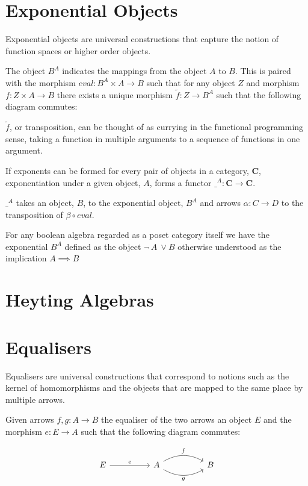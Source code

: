 \documentclass[a4paper,12pt]{article}
\begin{document}
\section{Exponential Objects}
Exponential objects are universal constructions that capture the notion of
function spaces or higher order objects.

The object $B^{A}$ indicates the mappings from the object $A$ to $B$. This is
paired with the morphism $eval: B^{A} \times A \rightarrow B$ such that for any
object $Z$ and morphism $f : Z\times A \rightarrow B$ there exists a unique
morphism $\tilde{f}: Z \rightarrow B^{A}$ such that the following diagram
commutes:


$\tilde{f}$, or transposition, can be thought of as currying in the functional
programming sense, taking a function in multiple arguments to a sequence of
functions in one argument.

If exponents can be formed for every pair of objects in a category, \textbf{C},
exponentiation under a given object, $A$, forms a functor $\_^{A}: \textbf{C}
\rightarrow \textbf{C}$.

$\_^{A}$ takes an object, $B$, to the exponential object, $B^{A}$ and arrows
$\alpha: C \rightarrow D$ to the transposition of $\beta \circ eval$.

For any boolean algebra regarded as a poset category itself we have the
exponential $B^{A}$ defined as the object $\neg \, A \ \lor B$ otherwise
understood as the implication $A \implies B$
\section{Heyting Algebras}
\section{Equalisers}
Equalisers are universal constructions that correspond to notions such as the
kernel of homomorphisms and the objects that are mapped to the same place by
multiple arrows.

Given arrows $f, g : A \rightarrow B $ the equaliser of the two arrows an object
$E$ and the morphism $e: E \rightarrow A$ such that the following diagram
commutes:

\[\begin{tikzcd}[sep=huge]
    E \arrow[r, "e"] & A \arrow[r, "f", bend left] \arrow[r, "g"', bend right] &
    B
\end{tikzcd}\]
\end{document}
